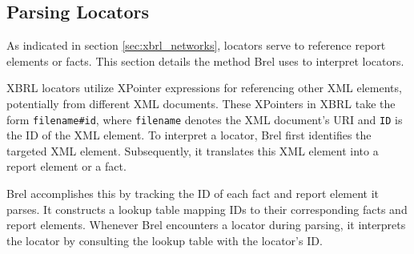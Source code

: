

\subsection{Parsing Locators}

As indicated in section \ref{sec:xbrl_networks}, locators serve to reference report elements or facts.
This section details the method Brel uses to interpret locators.

XBRL locators utilize XPointer\cite{w3_xpointer} expressions for referencing other XML elements, potentially from different XML documents.
These XPointers in XBRL take the form \texttt{filename\#id},
where \texttt{filename} denotes the XML document's URI and \texttt{ID} is the ID of the XML element.
To interpret a locator, Brel first identifies the targeted XML element.
Subsequently, it translates this XML element into a report element or a fact.

Brel accomplishes this by tracking the ID of each fact and report element it parses.
It constructs a lookup table mapping IDs to their corresponding facts and report elements.
Whenever Brel encounters a locator during parsing, it interprets the locator by consulting the lookup table with the locator's ID.

  

